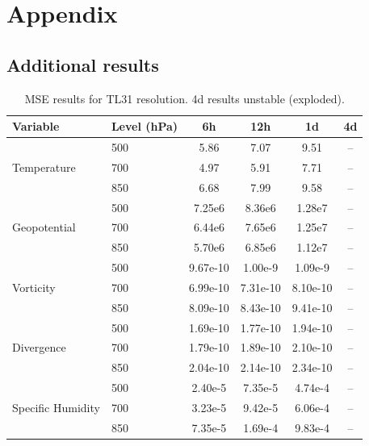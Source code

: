 
\chapter{Appendix} %

\label{AppendixA} %

\section{Additional results}
\begin{table}[ht]
\centering
\small
\begin{tabular}{llcccc}
\hline
\textbf{Variable} & \textbf{Level (hPa)} & \textbf{6h} & \textbf{12h} & \textbf{1d} & \textbf{4d} \\
\hline\hline

\multirow{3}{*}{Temperature}
    & 500 & 5.86 & 7.07 & 9.51 & -- \\
    & 700 & 4.97 & 5.91 & 7.71 & -- \\
    & 850 & 6.68 & 7.99 & 9.58 & -- \\ 
\hline

\multirow{3}{*}{Geopotential}
    & 500 & 7.25e6 & 8.36e6 & 1.28e7 & -- \\
    & 700 & 6.44e6 & 7.65e6 & 1.25e7 & -- \\
    & 850 & 5.70e6 & 6.85e6 & 1.12e7 & -- \\ 
\hline

\multirow{3}{*}{Vorticity}
    & 500 & 9.67e-10 & 1.00e-9 & 1.09e-9 & -- \\
    & 700 & 6.99e-10 & 7.31e-10 & 8.10e-10 & -- \\
    & 850 & 8.09e-10 & 8.43e-10 & 9.41e-10 & -- \\ 
\hline

\multirow{3}{*}{Divergence}
    & 500 & 1.69e-10 & 1.77e-10 & 1.94e-10 & -- \\
    & 700 & 1.79e-10 & 1.89e-10 & 2.10e-10 & -- \\
    & 850 & 2.04e-10 & 2.14e-10 & 2.34e-10 & -- \\ 
\hline

\multirow{3}{*}{Specific Humidity}
    & 500 & 2.40e-5 & 7.35e-5 & 4.74e-4 & -- \\
    & 700 & 3.23e-5 & 9.42e-5 & 6.06e-4 & -- \\
    & 850 & 7.35e-5 & 1.69e-4 & 9.83e-4 & -- \\ 
\hline

\end{tabular}
\caption{MSE results for TL31 resolution. 4d results unstable (exploded).}
\label{tab:MSE_31}
\end{table}


